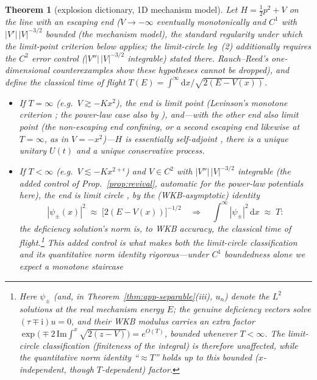 \documentclass[11pt]{article}
\newtheorem{theorem}{Theorem}[section]
\theoremstyle{definition}
\theoremstyle{remark}
\newcommand{\dd}{\mathrm{d}}
\newcommand{\ii}{\mathrm{i}}
\newcommand{\esa}{essentially self-adjoint}
\begin{document}
\begin{theorem}[explosion dictionary, 1D mechanism model]
\label{thm:dictionary}
Let $H=\tfrac12 p^{2}+V$ on the line with an escaping end
($V\to-\infty$ eventually monotonically and $C^{1}$ with
$|V'|\,|V|^{-3/2}$ bounded (the mechanism model), the standard regularity
under which the limit-\emph{point} criterion below applies; the
limit-circle leg~(2) additionally requires the $C^{2}$ error control
($|V''|\,|V|^{-3/2}$ integrable) stated there.
Rauch--Reed's one-dimensional counterexamples
\cite{RauchReed1973} show these hypotheses cannot be dropped), and
define the classical time of flight
$T(E)=\int^{\infty}\dd x/\sqrt{2(E-V(x))}$.
\begin{itemize}
\item[(1)] If $T=\infty$ (e.g.\ $V\gtrsim-Kx^{2}$), the end is limit
point (Levinson's monotone criterion \cite{CoddingtonLevinson}; the
power-law case also by \cite{ReedSimon2}), and---with the other end also
limit point (the non-escaping end confining, or a second escaping end
likewise at $T=\infty$, as in $V=-x^2$)---$H$ is \esa{} \cite{ReedSimon2},
there is a unique unitary $U(t)$
and a unique conservative process.
\item[(2)] If $T<\infty$ (e.g.\ $V\lesssim -Kx^{2+\epsilon}$) and $V\in C^{2}$
with $|V''|\,|V|^{-3/2}$ integrable (the added control of
Prop.~\ref{prop:revival}, automatic for the power-law potentials here),
the end is
limit circle \cite{ReedSimon2}, by the (WKB-asymptotic) identity
\begin{equation}
|\psi_{\pm}(x)|^{2}\;\approx\;\bigl[2(E-V(x))\bigr]^{-1/2}
\quad\Longrightarrow\quad
\int^{\infty}\!|\psi_{\pm}|^{2}\,\dd x \;\approx\; T :
\label{eq:onelineidentity}
\end{equation}
\emph{the deficiency solution's norm is, to WKB accuracy, the
classical time of flight}.\footnote{Here $\psi_{\pm}$ (and, in
Theorem~\ref{thm:app-separable}(iii), $u_{n}$) denote the $L^{2}$
solutions at the \emph{real} mechanism energy $E$; the genuine
deficiency vectors solve $(\tau\mp\ii)u=0$, and their WKB modulus
carries an extra factor
$\exp\!\bigl(\mp2\,\mathrm{Im}\!\int^{x}\!\sqrt{2(z-V)}\bigr)=e^{O(T)}$,
bounded whenever $T<\infty$. The limit-circle \emph{classification}
(finiteness of the integral) is therefore unaffected, while the
quantitative norm identity ``$\approx T$'' holds up to this bounded
($x$-independent, though $T$-dependent) factor.} This added control is what makes both the
limit-circle classification and its quantitative norm identity
rigorous---under $C^{1}$ boundedness alone we expect a monotone staircase

\end{itemize}
\end{theorem}
\end{document}
